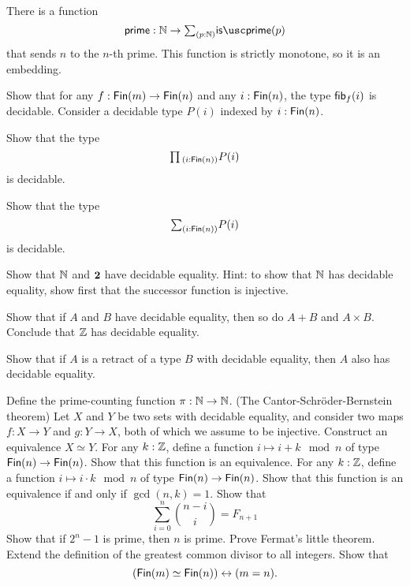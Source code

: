 \begin{cor}
  There is a function
  \begin{equation*}
    \primetype : \N \to \sm{p:\N}\isprime(p)
  \end{equation*}
  that sends $n$ to the $n$-th prime. This function is strictly monotone, so it is an embedding.
\end{cor}

\begin{exercises}
\exercise Show that for any $f:\mathsf{Fin}(m)\to\mathsf{Fin}(n)$ and any $i:\mathsf{Fin}(n)$, the type $\mathsf{fib}_{f}(i)$ is decidable.
\exercise Consider a decidable type $P(i)$ indexed by $i:\mathsf{Fin}(n)$.
  \begin{subexenum}
  \item Show that the type
    \begin{equation*}
      \prd{i:\Fin(n)}P(i)
    \end{equation*}
    is decidable.
  \item Show that the type
    \begin{equation*}
      \sm{i:\Fin(n)}P(i)
    \end{equation*}
    is decidable.
  \end{subexenum}
\exercise
  \begin{subexenum}
  \item Show that ${\mathbb{N}}$ and $\mathbf{2}$ have decidable equality. Hint: to show that ${\mathbb{N}}$ has decidable equality, show first that the successor function is injective.
  \item Show that if $A$ and $B$ have decidable equality, then so do $A+B$ and $A\times B$. Conclude that ${\mathbb{Z}}$ has decidable equality.
  \item Show that if $A$ is a retract of a type $B$ with decidable equality, then $A$ also has decidable equality.
  \end{subexenum}
\exercise Define the prime-counting function $\pi:{\mathbb{N}}\to{\mathbb{N}}$.
\exercise (The Cantor-Schr\"oder-Bernstein theorem) Let $X$ and $Y$ be two sets with decidable equality, and consider two maps $f:X\to Y$ and $g:Y\to X$, both of which we assume to be injective. Construct an equivalence $X\simeq Y$.
\exercise For any $k:{\mathbb{Z}}$, define a function $i\mapsto i+k \mod n$ of type $\mathsf{Fin}(n)\to\mathsf{Fin}(n)$. Show that this function is an equivalence.
\exercise For any $k:{\mathbb{Z}}$, define a function $i\mapsto i\cdot k \mod n$ of type $\mathsf{Fin}(n)\to\mathsf{Fin}(n)$. Show that this function is an equivalence if and only if $\gcd(n,k)=1$.
\exercise Show that
  \begin{equation*}
    \sum_{i=0}^n \binom{n-i}{i}=F_{n+1}
  \end{equation*}
\exercise Show that if $2^n-1$ is prime, then $n$ is prime.
\exercise Prove Fermat's little theorem.
\exercise Extend the definition of the greatest common divisor to all integers.
\exercise Show that
\begin{equation*}
  (\mathsf{Fin}(m)\simeq\mathsf{Fin}(n))\leftrightarrow(m=n).
\end{equation*}
\end{exercises}
